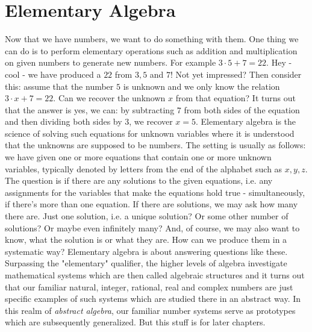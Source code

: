 \section{Elementary Algebra}
Now that we have numbers, we want to do something with them. One thing we can do is to perform elementary operations such as addition and multiplication on given numbers to generate new numbers. For example $3 \cdot 5 + 7 = 22$. Hey - cool - we have produced a $22$ from $3,5$ and $7$! Not yet impressed? Then consider this: assume that the number $5$ is unknown and we only know the relation $3 \cdot x + 7 = 22$. Can we recover the unknown $x$ from that equation? It turns out that the answer is yes, we can: by subtracting $7$ from both sides of the equation and then dividing both sides by $3$, we recover $x = 5$. Elementary algebra is the science of solving such equations for unknown variables where it is understood that the unknowns are supposed to be numbers. The setting is usually as follows: we have given one or more equations that contain one or more unknown variables, typically denoted by letters from the end of the alphabet such as $x,y,z$. The question is if there are any solutions to the given equations, i.e. any assignments for the variables that make the equations hold true - simultaneously, if there's more than one equation. If there are solutions, we may ask how many there are. Just one solution, i.e. a unique solution? Or some other number of solutions? Or maybe even infinitely many? And, of course, we may also want to know, what the solution is or what they are. How can we produce them in a systematic way? Elementary algebra is about answering questions like these. Surpassing the "elementary" qualifier, the higher levels of algebra investigate mathematical systems which are then called algebraic structures and it turns out that our familiar natural, integer, rational, real and complex numbers are just specific examples of such systems which are studied there in an abstract way. In this realm of \emph{abstract algebra}, our familiar number systems serve as prototypes which are subsequently generalized. But this stuff is for later chapters. 





